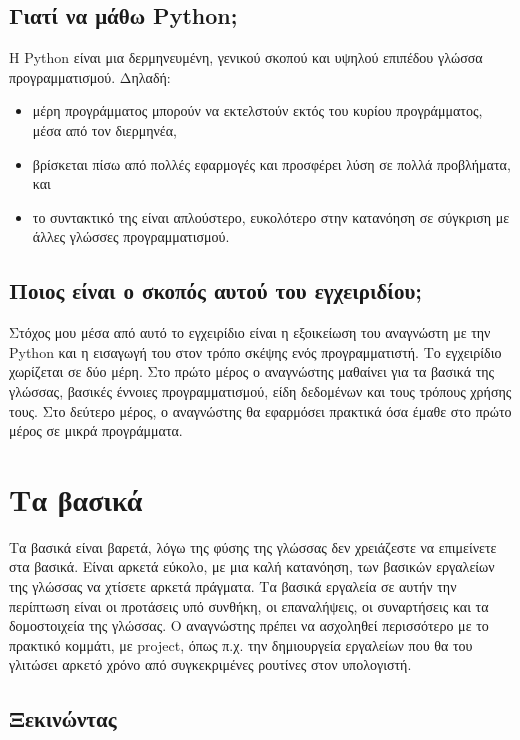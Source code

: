 \documentclass[a4paper,14pt]{extreport}
\begin{document}
\section{Γιατί να μάθω Python;}

Η Python είναι μια δερμηνευμένη, γενικού σκοπού και υψηλού επιπέδου γλώσσα
προγραμματισμού. Δηλαδή:
\begin{itemize}
    \item μέρη προγράμματος μπορούν να εκτελστούν εκτός του κυρίου
          προγράμματος, μέσα από τον διερμηνέα,
    \item βρίσκεται πίσω από πολλές εφαρμογές και προσφέρει λύση σε πολλά
          προβλήματα, και
    \item το συντακτικό της είναι απλούστερο, ευκολότερο στην κατανόηση σε
          σύγκριση με άλλες γλώσσες προγραμματισμού.
\end{itemize}

\section{Ποιος είναι ο σκοπός αυτού του εγχειριδίου;}

Στόχος μου μέσα από αυτό το εγχειρίδιο είναι η εξοικείωση του αναγνώστη
με την Python και η εισαγωγή του στον τρόπο σκέψης ενός προγραμματιστή.
Το εγχειρίδιο χωρίζεται σε δύο μέρη. Στο πρώτο μέρος ο αναγνώστης μαθαίνει
για τα βασικά της γλώσσας, βασικές έννοιες προγραμματισμού, είδη δεδομένων
και τους τρόπους χρήσης τους. Στο δεύτερο μέρος, ο αναγνώστης θα εφαρμόσει
πρακτικά όσα έμαθε στο πρώτο μέρος σε μικρά προγράμματα.

\chapter{Τα βασικά}

Τα βασικά είναι βαρετά, λόγω της φύσης της γλώσσας δεν χρειάζεστε να επιμείνετε στα βασικά. Είναι αρκετά εύκολο, με μια καλή κατανόηση, των βασικών εργαλείων της γλώσσας να χτίσετε αρκετά πράγματα. Τα βασικά εργαλεία σε αυτήν την περίπτωση είναι οι προτάσεις υπό συνθήκη, οι επαναλήψεις, οι συναρτήσεις και τα δομοστοιχεία της γλώσσας. Ο αναγνώστης πρέπει να ασχοληθεί περισσότερο με το πρακτικό κομμάτι, με project, όπως π.χ. την δημιουργεία εργαλείων που θα του γλιτώσει αρκετό χρόνο από συγκεκριμένες ρουτίνες στον υπολογιστή.
\newpage

\section{Ξεκινώντας}
\end{document}
